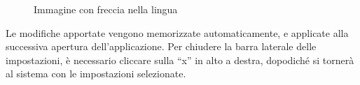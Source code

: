 \begin{figure}[H]
  \centering
  \caption{Immagine con freccia nella lingua}
\end{figure}

\par Le modifiche apportate vengono memorizzate automaticamente, e applicate alla successiva apertura dell'applicazione. Per chiudere la barra laterale delle impostazioni, è necessario cliccare sulla ``x'' in alto a destra, dopodiché si tornerà al sistema con le impostazioni selezionate.
